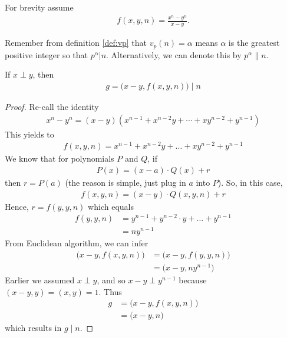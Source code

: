 
	For brevity assume
	\begin{align*}
		f(x,y,n)=\frac{x^n-y^n}{x-y}.
	\end{align*}

	Remember from definition \eqref{def:vp} that $v_{p}(n)=\alpha$ means $\alpha$ is the greatest positive integer so that $p^\alpha|n$. Alternatively, we can denote this by $p^\alpha\|n$.

	\begin{theorem}\label{thm:egl}
		If $x\perp y$, then
			\begin{align*}
				g=\big(x-y,f(x,y,n)\big)\mid n
			\end{align*}
	\end{theorem}

	\begin{proof}
		Re-call the identity
			\begin{align*}
				x^n-y^n=(x-y)\left(x^{n-1}+x^{n-2}y+\cdots+xy^{n-2}+y^{n-1}\right)
			\end{align*}
		This yields to
			\begin{align*}
				f(x,y,n)=x^{n-1}+x^{n-2}y+\ldots+xy^{n-2}+y^{n-1}
			\end{align*}
		We know that for polynomials $P$ and $Q$, if
			\begin{align*}
				P(x)=(x-a)\cdot Q(x)+r
			\end{align*}
		then $r=P(a)$ (the reason is simple, just plug in $a$ into $P$). So, in this case,
			\begin{align*}
				f(x,y,n)=(x-y)\cdot Q(x,y,n)+r
			\end{align*}
		Hence, $r=f(y,y,n)$ which equals
		\begin{align*}
			f(y,y,n)
				& =y^{n-1}+y^{n-2}\cdot y+\ldots+y^{n-1}\\
				& =ny^{n-1}
		\end{align*}
		From Euclidean algorithm, we can infer
		\begin{align*}
			\big(x-y,f(x,y,n)\big)
				& =\big(x-y,f(y,y,n)\big)\\
				& =\big(x-y,ny^{n-1}\big)
		\end{align*}
		Earlier we assumed $x\perp y$, and so $x-y\perp y^{n-1}$ because $(x-y,y)=(x,y)=1$. Thus
		\begin{align*}
			g
				& =\big(x-y,f(x,y,n)\big)\\
				& =\big(x-y,n\big)
		\end{align*}
		which results in $g\mid n$.
	\end{proof}

